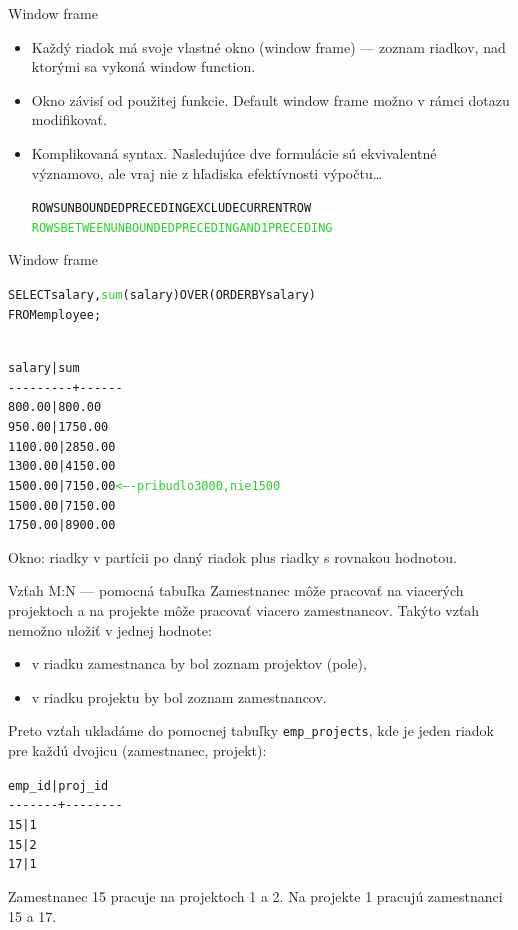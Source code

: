 \documentclass[12pt]{beamer}
\def\blue#1{\textcolor{Cerulean}{#1}}
\def\green#1{\textcolor{LimeGreen}{#1}}
\begin{document}
\begin{frame}[fragile]{Window frame}
\small
\begin{itemize}
\item Každý riadok má svoje vlastné okno (window frame) --- zoznam riadkov, nad ktorými sa vykoná window function.
\item Okno závisí od použitej funkcie. Default window frame možno v rámci dotazu modifikovať.
\item Komplikovaná syntax. Nasledujúce dve formulácie sú ekvivalentné významovo, ale vraj nie z hľadiska efektívnosti výpočtu\dots
\begin{alltt}
\blue{ROWS UNBOUNDED PRECEDING EXCLUDE CURRENT ROW}
\green{ROWS BETWEEN UNBOUNDED PRECEDING AND 1 PRECEDING}
\end{alltt}
\end{itemize}
\end{frame}

\begin{frame}[fragile]{Window frame}
\begin{alltt}
SELECT salary, \green{sum}(salary) \alert{OVER (ORDER BY salary)}
FROM employee;
\end{alltt}
{\scriptsize
\begin{alltt}
\blue{
 salary  |   sum
-{}-{}-{}-{}-{}-{}-{}-{}-{}+-{}-{}-{}-{}-{}-{}
  800.00 |   800.00
  950.00 |  1750.00
 1100.00 |  2850.00
 1300.00 |  4150.00
 1500.00 |  7150.00   \green{<---- pribudlo 3000, nie 1500}
 1500.00 |  7150.00
 1750.00 |  8900.00
}
\end{alltt}
}
Okno: riadky v partícii po daný riadok plus riadky s rovnakou hodnotou.
\end{frame}

\begin{frame}[fragile]{Vzťah M:N --- pomocná tabuľka}
Zamestnanec môže pracovať na viacerých projektoch a na projekte môže pracovať viacero zamestnancov.
Takýto vzťah nemožno uložiť v jednej hodnote:
\begin{itemize}
\item v riadku zamestnanca by bol zoznam projektov (pole),
\item v riadku projektu by bol zoznam zamestnancov.
\end{itemize}
Preto vzťah ukladáme do pomocnej tabuľky \verb|emp_projects|, kde je jeden riadok pre každú dvojicu (zamestnanec, projekt):
\bigskip

\begin{minipage}[t]{0.4\linewidth}
\footnotesize
\begin{alltt}
emp_id | proj_id
-{}-{}-{}-{}-{}-{}-{}+-{}-{}-{}-{}-{}-{}-{}-{}
    15 |       1
    15 |       2
    17 |       1
\end{alltt}
\end{minipage}
\hfill
\begin{minipage}[t]{0.55\linewidth}
\footnotesize
Zamestnanec 15 pracuje na projektoch 1 a 2.
Na projekte 1 pracujú zamestnanci 15 a 17.
\end{minipage}
\end{frame}
\end{document}
